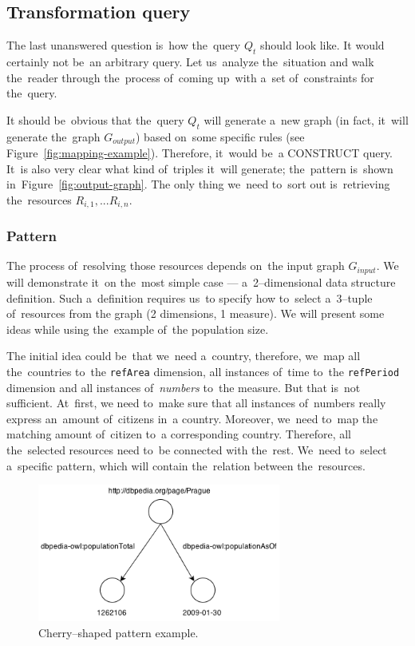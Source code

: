 \subsection{Transformation query}

The last unanswered question is~how the~query $Q_t$ should look like. 
It would certainly not be~an arbitrary query. Let us~analyze the~situation and 
walk the~reader through the~process of~coming up~with a~set of~constraints for the~query.

It should be~obvious that the~query $Q_t$ will generate a~new graph
(in fact, it~will generate the~graph $G_{output}$) based on~some specific rules
(see Figure~\ref{fig:mapping-example}). 
Therefore, it~would be~a CONSTRUCT query. It~is also very clear what kind of~triples it~will generate; the~pattern is~shown in~Figure~\ref{fig:output-graph}.
The only thing we~need to~sort out is~retrieving the~resources $R_{i,1}, ... R_{i,n}$.

\subsubsection{Pattern}
\label{sec:pattern-definition}
The process of~resolving those resources depends on~the input graph $G_{input}$.
We will demonstrate it~on the~most simple case --- a~2--dimensional data structure 
definition. Such a~definition requires us~to specify how to~select a~3--tuple of~resources from 
the graph (2 dimensions, 1 measure).
We will present some ideas while using the~example of~the population size.

The initial idea could be~that we~need a~country, therefore, we~map all the~countries to~the \texttt{refArea} dimension, all instances of~time to~the \texttt{refPeriod} 
dimension and all instances of~\emph{numbers} to~the measure. But that is~not sufficient. At~first,
we need to~make sure that all instances of~numbers 
really express an~amount of~citizens in~a country. Moreover, we~need to~map the
matching amount of~citizen to~a corresponding country. Therefore, all the~selected resources need to~be connected with the~rest. We~need to~select a~specific pattern, which will contain the~relation between the~resources.

\begin{figure}
	\centering
	\includegraphics[width=80mm]{images/cherry.png}
	\caption{Cherry--shaped pattern example.}
	\label{fig:cherry}
\end{figure}

